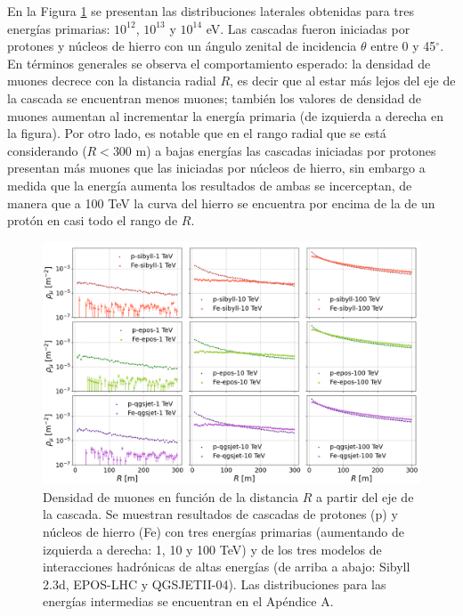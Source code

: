 En la Figura \ref{fig:lateraldist} se presentan las distribuciones laterales obtenidas para tres energ\'ias primarias: $10^{12}$, $10^{13}$ y $10^{14}$ eV. Las cascadas fueron iniciadas por protones y n\'ucleos de hierro con un \'angulo zenital de incidencia $\theta$ entre 0 y 45$^{\circ}$. En t\'erminos generales se observa el comportamiento esperado: la densidad de muones decrece con la distancia radial $R$, es decir que al estar m\'as lejos del eje de la cascada se encuentran menos muones; tambi\'en los valores de densidad de muones aumentan al incrementar la energ\'ia primaria (de izquierda a derecha en la figura). Por otro lado, es notable que en el rango radial que se est\'a considerando ($R<300$ m) a bajas energ\'ias las cascadas iniciadas por protones presentan m\'as muones que las iniciadas por n\'ucleos de hierro, sin embargo a medida que la energ\'ia aumenta los resultados de ambas se incerceptan, de manera que a 100 TeV la curva del hierro se encuentra por encima de la de un prot\'on en casi todo el rango de $R$.\\
		\begin{figure}[] 
	\includegraphics[width=\textwidth]{Figuras/lateraldist}
	\caption{Densidad de muones en funci\'on de la distancia $R$ a partir del eje de la cascada. Se muestran resultados de cascadas de protones (p) y n\'ucleos de hierro (Fe) con tres energ\'ias primarias (aumentando de izquierda a derecha: 1, 10 y 100 TeV) y de los tres modelos de interacciones hadr\'onicas de altas energ\'ias (de arriba a abajo: Sibyll 2.3d, EPOS-LHC y QGSJETII-04). Las distribuciones para las energ\'ias intermedias se encuentran en el Ap\'endice A.}
	\label{fig:lateraldist}
	\end{figure}	

